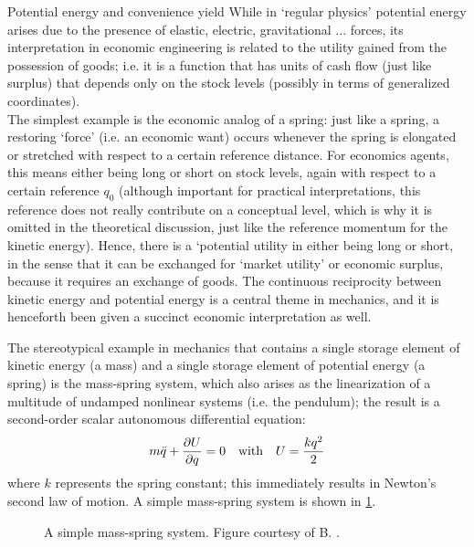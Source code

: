 \begin{econ}{Potential energy and convenience yield}
    While in `regular physics' potential energy arises due to the presence of elastic, electric, gravitational ... forces, its interpretation in economic engineering is related to the utility gained from the possession of goods; i.e. it is a function that has units of cash flow (just like surplus) that depends only on the stock levels (possibly in terms of generalized coordinates).\\

    The simplest example is the economic analog of a spring: just like a spring, a restoring `force' (i.e. an economic want) occurs whenever the spring is elongated or stretched with respect to a certain reference distance. For economics agents, this means either being long or short on stock levels, again with respect to a certain reference $q_0$ (although important for practical interpretations, this reference does not really contribute on a conceptual level, which is why it is omitted in the theoretical discussion, just like the reference momentum for the kinetic energy). Hence, there is a `potential utility in either being long or short, in the sense that it can be exchanged for `market utility' or economic surplus, because it requires an exchange of goods. The continuous reciprocity between kinetic energy and 
    potential energy is a central theme in mechanics, and it is henceforth been given a succinct economic interpretation as well.
\end{econ}
The stereotypical example in mechanics that contains a single storage element of kinetic energy (a mass) and a single storage  element of potential energy (a spring) is the mass-spring system, which also arises as the linearization of a multitude of undamped nonlinear systems (i.e. the pendulum); the result is a second-order scalar autonomous differential equation:
\begin{equation}
    m\ddot{q} + \pdv{U}{q} = 0 \quad \text{with} \quad U = \frac{kq^2}{2}
    \label{eq:mass_spring}
\end{equation}
where $k$ represents the spring constant; this immediately results in Newton's second law of motion. A simple mass-spring system is shown in \cref{fig:mass_spring}.
\begin{figure}[ht]
    \centering
    
    \caption{A simple mass-spring system. Figure courtesy of B. \citet{Krabbenborg2021}.}
    \label{fig:mass_spring}
\end{figure}

